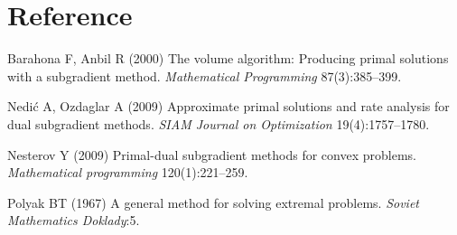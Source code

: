 \documentclass[
  a4paper,
,tablecaptionabove
]{scrartcl}
\numberwithin{equation}{section}
\newlength{\cslhangindent}
\newenvironment{cslreferences}%
  {\setlength{\parindent}{0pt}%
  \everypar{\setlength{\hangindent}{\cslhangindent}}\ignorespaces}%
  {\par}
\begin{document}
\hypertarget{reference}{%
  \section*{Reference}\label{reference}}

\hypertarget{refs}{}
\begin{cslreferences}
  \leavevmode\hypertarget{ref-barahona_volume_2000}{}%
  Barahona F, Anbil R (2000) The volume algorithm: Producing primal
  solutions with a subgradient method. \emph{Mathematical Programming}
  87(3):385--399.

  \leavevmode\hypertarget{ref-nedic_approximate_2009}{}%
  Nedić A, Ozdaglar A (2009) Approximate primal solutions and rate
  analysis for dual subgradient methods. \emph{SIAM Journal on
    Optimization} 19(4):1757--1780.

  \leavevmode\hypertarget{ref-nesterov_primal-dual_2009}{}%
  Nesterov Y (2009) Primal-dual subgradient methods for convex problems.
  \emph{Mathematical programming} 120(1):221--259.

  \leavevmode\hypertarget{ref-polyak_general_nodate}{}%
  Polyak BT (1967) A general method for solving extremal problems.
  \emph{Soviet Mathematics Doklady}:5.
\end{cslreferences}
\end{document}
